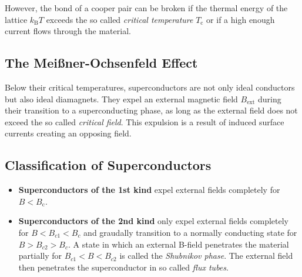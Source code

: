 However, the bond of a cooper pair can be broken if the thermal energy of the lattice $k_\text{B}T$ exceeds the so called \textit{critical temperature} $T_\text{c}$ or if a high enough current flows through the material.

\subsection{The Meißner-Ochsenfeld Effect}
Below their critical temperatures, superconductors are not only ideal conductors but also ideal diamagnets.
They expel an external magnetic field $B_\text{ext}$ during their transition to a superconducting phase, as long as the external field does not exceed the so called \textit{critical field}.
This expulsion is a result of induced surface currents creating an opposing field.

\subsection{Classification of Superconductors}
\begin{itemize}
	\item \textbf{Superconductors of the 1st kind} expel external fields completely for $B<B_\text{c}$.
	\item \textbf{Superconductors of the 2nd kind} only expel external fields completely for $B<B_{c1}<B_c$ and graudally transition to a normally conducting state for  $B>B_{c2}>B_c$.
	A state in which an external B-field penetrates the material partially for $B_{c1}<B<B_{c2}$ is called the \textit{Shubnikov phase}.
	The external field then penetrates the superconductor in so called \textit{flux tubes}.
\end{itemize}
